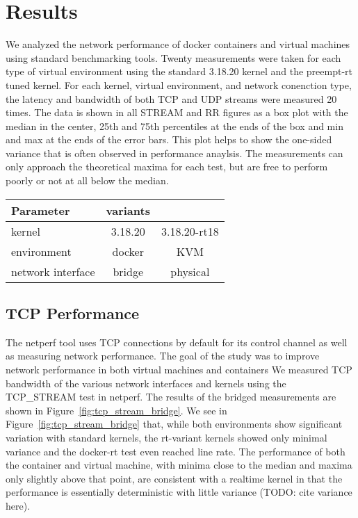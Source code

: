 \chapter{Results}
\label{cha:results}
\label{sec:results}
We analyzed the network performance of docker containers and virtual machines using standard benchmarking tools.  
Twenty measurements were taken for each type of virtual environment using the standard 3.18.20 kernel and the preempt-rt tuned kernel.
For each kernel, virtual environment, and network conenction type, the latency and bandwidth of both TCP and UDP streams were measured 20 times.
The data is shown in all STREAM and RR figures as a box plot with the median in the center, 25th and 75th percentiles at the ends of the box and min and max at the ends of the error bars.
This plot helps to show the one-sided variance that is often observed in performance anaylsis.  
The measurements can only approach the theoretical maxima for each test, but are free to perform poorly or not at all below the median.  

\begin{table}[ht!]
    \centering
    \begin{tabular}{|l|c|c|}
    \hline
    Parameter & variants & \\
    \hline \hline
    kernel & 3.18.20 & 3.18.20-rt18 \\ 
    environment & docker & KVM \\ 
    network interface & bridge & physical \\ 
    \hline
    \end{tabular}
\end{table}

\section{TCP Performance} %
\label{sec:tcp_performance}
The netperf tool uses TCP connections by default for its control channel as well as measuring network performance. 
    The goal of the study was to improve network performance in both virtual machines and containers 
We measured TCP bandwidth of the various network interfaces and kernels using the TCP\_STREAM test in netperf.
The results of the bridged measurements are shown in Figure~\ref{fig:tcp_stream_bridge}.
We see in Figure~\ref{fig:tcp_stream_bridge} that, while both environments show significant variation with standard kernels, the rt-variant kernels showed only minimal variance and the docker-rt test even reached line rate.  
The performance of both the container and virtual machine, with minima close to the median and maxima only slightly above that point, are consistent with a realtime kernel in that the performance is essentially deterministic with little variance (TODO: cite variance here).

